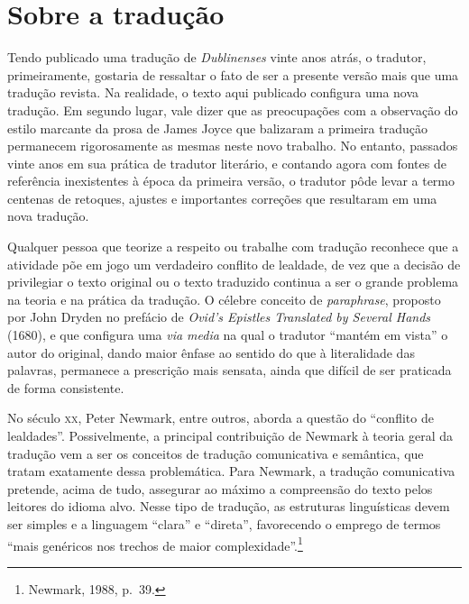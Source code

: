 \section{Sobre a tradução}

Tendo publicado uma tradução de \textit{Dublinenses} vinte anos atrás, o
tradutor, primeiramente, gostaria de ressaltar o fato de ser a presente versão
mais que uma tradução revista.  Na realidade, o texto aqui publicado configura
uma nova tradução.  Em segundo lugar, vale dizer que as preocupações com a
observação do estilo marcante da prosa de James Joyce que balizaram a primeira
tradução permanecem rigorosamente as mesmas neste novo trabalho.  No entanto,
passados vinte anos em sua prática de tradutor literário, e contando agora com
fontes de referência inexistentes à época da primeira versão, o tradutor pôde
levar a termo centenas de retoques, ajustes e importantes correções que
resultaram em uma nova tradução.

Qualquer pessoa que teorize a respeito ou trabalhe com tradução reconhece que a
atividade põe em jogo um verdadeiro conflito de lealdade, de vez que a decisão
de privilegiar o texto original ou o texto traduzido continua a ser o grande
problema na teoria e na prática da tradução. O célebre conceito de
\textit{paraphrase}, proposto por John Dryden no prefácio de \textit{Ovid’s
Epistles Translated by Several Hands} (1680), e que configura uma \textit{via
media} na qual o tradutor “mantém em vista” o autor do original, dando maior
ênfase ao sentido do que à literalidade das palavras, permanece a prescrição
mais sensata, ainda que difícil de ser praticada de forma consistente.

No século \textsc{xx}, Peter Newmark, entre outros, aborda a questão do
“conflito de lealdades”. Possivelmente, a principal contribuição de Newmark à
teoria geral da tradução vem a ser os conceitos de tradução comunicativa e
semântica, que tratam exatamente dessa problemática. Para Newmark, a tradução
comunicativa pretende, acima de tudo, assegurar ao máximo a compreensão do
texto pelos leitores do idioma alvo. Nesse tipo de tradução, as estruturas
linguísticas devem ser simples e a linguagem “clara” e “direta”, favorecendo o
emprego de termos “mais genéricos nos trechos de maior complexidade”.\footnote{ Newmark,
1988, p.~39.}

